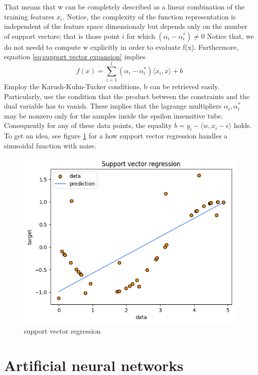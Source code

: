 That means that w can be completely described as a linear combination of the training features $x_i$.
Notice, the complexity of the function representation is independent of the feature space dimensionaly but depends only on the number of support vectors; that is those point $i$ for which $(\alpha_i-\alpha_i^*)\neq 0$
Notice that, we do not needd to compute w explicitly in order to evaluate f(x).
Furthermore, equation \ref{eq:support vector expansion} implies
\begin{equation}
    f(x)=\sum\limits_{i=1}^l(\alpha_i-\alpha_i^*)\langle x_i, x\rangle +b
\end{equation}
Employ the Karush-Kuhn-Tucker conditions, b can be retrieved easily. Particularly, use the condition that the product between the constraints and the dual variable has to vanish. These implies that the lagrange multipliers $\alpha_i, \alpha_i^*$ may be nonzero only for the samples inside the epsilon insensitive tube. Consequently for any of these data points, the equality $b=y_i-\langle w, x_i-\epsilon\rangle$ holds.
To get an idea, see figure \ref{fig:svr1} for a how support vector regression handles a sinusoidal function with noise.
\\
\begin{figure}
    \includegraphics[width=\textwidth]{images/svr1.png}
    \caption{support vector regression}
    \label{fig:svr1}
\end{figure}

\section{Artificial neural networks}
